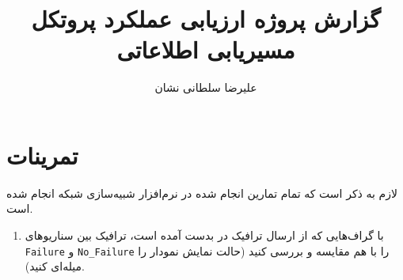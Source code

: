 \documentclass[a4paper]{article}
\title{گزارش پروژه ارزیابی عملکرد پروتکل مسیریابی اطلاعاتی}
\author{علیرضا سلطانی نشان}
\begin{document}
\maketitle

\section{تمرینات}

لازم به ذکر است که تمام تمارین انجام شده در نرم‌افزار شبیه‌سازی شبکه 
انجام شده است.

\begin{enumerate}
    \item با گراف‌هایی که از ارسال ترافیک در  بدست آمده است، ترافیک بین
    سناریو‌های \texttt{Failure} و \texttt{No\_Failure} را با هم مقایسه و بررسی
    کنید (حالت نمایش نمودار را میله‌ای کنید).


\end{enumerate}
\end{document}
